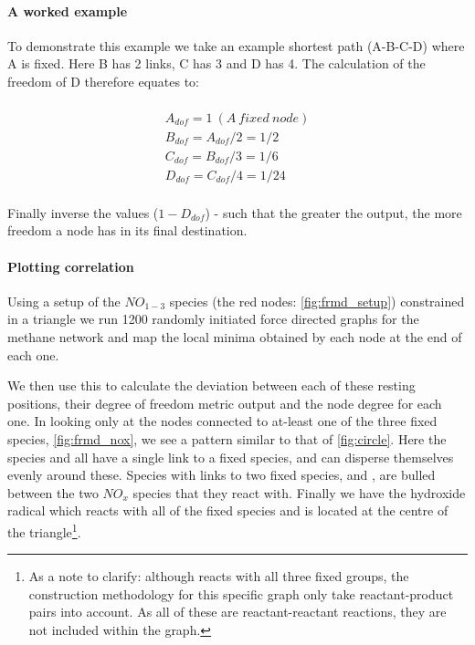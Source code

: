 \paragraph*{A worked example}
To demonstrate this example we take an example shortest path (A-B-C-D) where A is fixed. Here B has 2 links, C has 3 and D has 4. The calculation of the freedom of D therefore equates to:
\begin{center}
\begin{multline} \\
    A_{dof}  = 1\ (A\  fixed\  node)\\
    B_{dof}  = A_{dof} /  2 = 1/2\\
    C_{dof}  = B_{dof} /  3 = 1/6\\
    D_{dof}  = C_{dof} /  4 = 1/24\\
\end{multline}
\end{center}
 Finally inverse the values ($1-D_{dof}$) - such that the greater the output, the more freedom a node has in its final destination. 
 
 \paragraph*{Plotting correlation}
 Using a setup of the $NO_{1-3}$ species (the red nodes: \autoref{fig:frmd_setup}) constrained in a triangle we run 1200 randomly initiated force directed graphs for the methane network and map the local minima obtained by each node at the end of each one.
 
  We then use this to calculate the deviation between each of these resting positions, their degree of freedom metric output and the node degree for each one. In looking only at the nodes connected to at-least one of the three fixed species, \autoref{fig:frmd_nox}, we see a pattern similar to that of \autoref{fig:circle}. Here the species  and  all have a single link to a fixed species, and can disperse themselves evenly around these. Species with links to two fixed species,  and , are bulled between the two $NO_x$ species that they react with. Finally we have the hydroxide radical which reacts with all of the fixed species and is located at the centre of the triangle\footnote{As a note to clarify: although  reacts with all three fixed groups, the construction methodology for this specific graph only take reactant-product pairs into account. As all of these are reactant-reactant reactions, they are not included within the graph.}.
  

